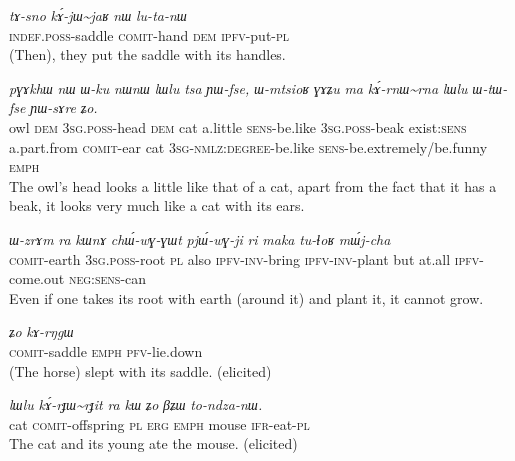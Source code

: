 \documentclass[oldfontcommands,oneside,a4paper,11pt]{article}
\newcommand{\ipa}[1]{{\phon\textit{#1}}} %
\newcommand{\tld}{\textasciitilde{}}
\begin{document}
\begin{exe}
\ex \label{ex:kAjWjaR}
\gll
\ipa{tɤ-sno}  	\ipa{kɤ́-jɯ\tld{}jaʁ}  	\ipa{nɯ}  	\ipa{lu-ta-nɯ}  \\
\textsc{indef.poss}-saddle \textsc{comit}-hand \textsc{dem} \textsc{ipfv}-put-\textsc{pl} \\
\glt (Then), they put the saddle with its handles.
\end{exe}

\begin{exe}
\ex \label{ex:kArnWrna}
\gll
\ipa{pɣɤkhɯ}  	\ipa{nɯ}  	\ipa{ɯ-ku}  	\ipa{nɯnɯ}  	\ipa{lɯlu}  	\ipa{tsa}  	\ipa{ɲɯ-fse,}  	\ipa{ɯ-mtsioʁ}  	\ipa{ɣɤʑu}  	\ipa{ma}  \ipa{kɤ́-rnɯ\tld{}rna}  	\ipa{lɯlu}  	\ipa{ɯ-tɯ-fse}  	\ipa{ɲɯ-sɤre}  	\ipa{ʑo.}  \\
owl \textsc{dem} \textsc{3sg.poss}-head \textsc{dem} cat a.little \textsc{sens}-be.like \textsc{3sg.poss}-beak exist:\textsc{sens} a.part.from \textsc{comit}-ear cat \textsc{3sg-nmlz:degree}-be.like \textsc{sens}-be.extremely/be.funny \textsc{emph} \\
\glt The owl's head looks a little like that of a cat, apart from the fact that it has a beak, it looks very much like a cat with its ears.
\end{exe}


\begin{exe}
\ex \label{ex:kAthAlwWlwa}
\gll \ipa{kɤ́-thɤlwɯ\tld{}lwa}  	\ipa{ɯ-zrɤm}  	\ipa{ra}  	\ipa{kɯnɤ}  	\ipa{chɯ́-wɣ-ɣɯt}  	\ipa{pjɯ́-wɣ-ji}  	\ipa{ri}  	\ipa{maka}  	\ipa{tu-ɬoʁ}  	\ipa{mɯ́j-cha}  \\
\textsc{comit}-earth \textsc{3sg.poss}-root \textsc{pl} also \textsc{ipfv-inv}-bring \textsc{ipfv-inv}-plant but at.all \textsc{ipfv}-come.out \textsc{neg:sens}-can \\
\glt Even if one takes its root with earth (around it) and plant it, it cannot grow.
\end{exe}


\begin{exe}
\ex \label{ex:kAsnWsno}
\gll \ipa{kɤ́-snɯ\tld{}sno}  	\ipa{ʑo}  	\ipa{kɤ-rŋgɯ}  \\
\textsc{comit}-saddle \textsc{emph} \textsc{pfv}-lie.down \\
\glt (The horse) slept with its saddle. (elicited)
\end{exe}

\begin{exe}
\ex \label{ex:kArJWrJit.kW}
\gll 
\ipa{lɯlu} 	\ipa{kɤ́-rɟɯ\tld{}rɟit} 	\ipa{ra} 	\ipa{kɯ} 	\ipa{ʑo} 	\ipa{βʑɯ} 	\ipa{to-ndza-nɯ.} \\
cat \textsc{comit}-offspring \textsc{pl}  \textsc{erg} \textsc{emph} mouse \textsc{ifr}-eat-\textsc{pl} \\
\glt The cat and its young ate the mouse. (elicited)
\end{exe}
\end{document}
